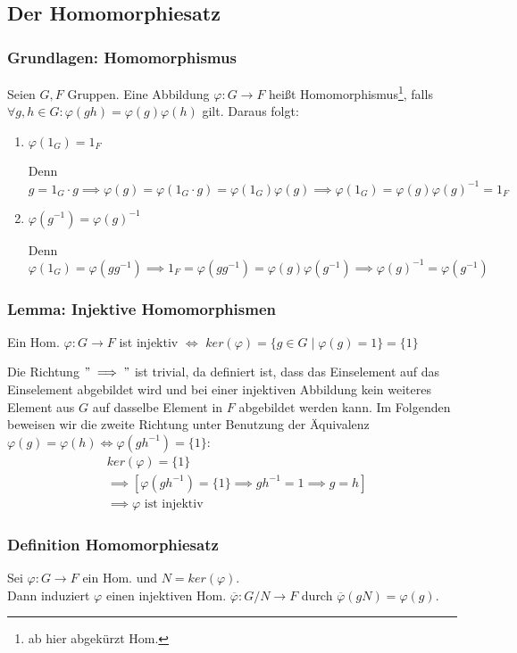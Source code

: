 \documentclass[12pt, german]{article}
\begin{document}
	\subsection{Der Homomorphiesatz}		
	\subsubsection{Grundlagen: Homomorphismus}
	Seien $G,F$ Gruppen. 
	Eine Abbildung $\varphi: G \to F$ hei\ss t Homomorphismus\footnote{ab hier abgekürzt Hom.}, falls $\forall g,h \in G : \varphi(gh) = \varphi(g)\varphi(h)$ gilt. Daraus folgt:\\
	\begin{enumerate}[label=\roman*)]
		\item $\varphi(1_G) = 1_F$ ~\par
		Denn $g=1_G\cdot g \implies \varphi(g)=\varphi(1_G\cdot g)=\varphi(1_G)\varphi(g) \implies \varphi(1_G) = \varphi(g) \varphi(g)^{-1} = 1_F$
		
		\item $\varphi(g^{-1})=\varphi(g)^{-1}$ ~\par
		Denn $\varphi(1_G)=\varphi(gg^{-1}) \implies 1_F =\varphi(gg^{-1})= \varphi(g)\varphi(g^{-1}) \implies \varphi(g)^{-1} = \varphi(g^{-1})$
	\end{enumerate}
	
	\subsubsection{Lemma: Injektive Homomorphismen}
	Ein Hom. $\varphi: G \to F$ ist injektiv $\iff$ $ker(\varphi) = \{g \in G \mid \varphi(g)= 1\} = \{1\}$ 
	
	Die Richtung $"\implies "$ ist trivial, da definiert ist, dass das Einselement auf das Einselement abgebildet wird und bei einer injektiven Abbildung kein weiteres Element aus $G$ auf dasselbe Element in $F$ abgebildet werden kann.
	Im Folgenden beweisen wir die zweite Richtung unter Benutzung der Äquivalenz $\varphi(g) = \varphi(h) \iff \varphi(gh^{-1}) = \{1\} $:
	\begin{align*}
		&ker(\varphi) = \{1\} \\
		&\implies [\varphi(gh^{-1}) = \{1\} \implies gh^{-1} = 1 \implies g = h] \\ 
		&\implies \varphi \text{ ist injektiv}
	\end{align*}
	
	\subsubsection{Definition Homomorphiesatz}
	Sei $\varphi: G \to F$ ein Hom.  und $N = ker(\varphi)$. \\
	Dann induziert $\varphi$ einen injektiven Hom. $\overline{\varphi} : G/N \to F$ durch $\overline{\varphi}(gN) = \varphi(g)$.
	\newline
	
\end{document}

